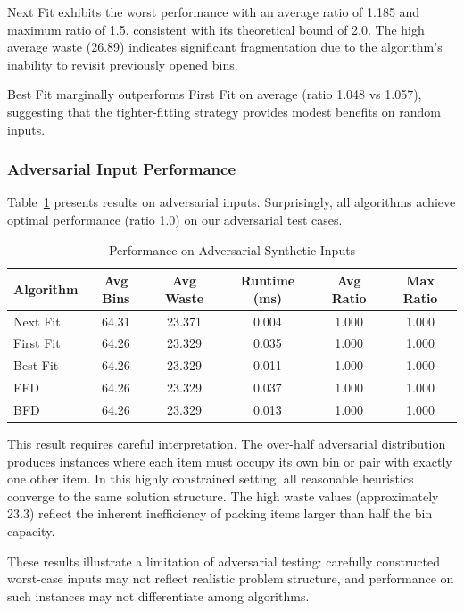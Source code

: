 \documentclass[11pt,a4paper]{article}
\begin{document}
Next Fit exhibits the worst performance with an average ratio of 1.185 and maximum ratio of 1.5, consistent with its theoretical bound of 2.0. The high average waste (26.89) indicates significant fragmentation due to the algorithm's inability to revisit previously opened bins.

Best Fit marginally outperforms First Fit on average (ratio 1.048 vs 1.057), suggesting that the tighter-fitting strategy provides modest benefits on random inputs.

\subsubsection{Adversarial Input Performance}

Table~\ref{tab:adversarial_results} presents results on adversarial inputs. Surprisingly, all algorithms achieve optimal performance (ratio 1.0) on our adversarial test cases.

\begin{table}[htbp]
\centering
\caption{Performance on Adversarial Synthetic Inputs}
\label{tab:adversarial_results}
\begin{tabular}{lccccc}
\toprule
\textbf{Algorithm} & \textbf{Avg Bins} & \textbf{Avg Waste} & \textbf{Runtime (ms)} & \textbf{Avg Ratio} & \textbf{Max Ratio} \\
\midrule
Next Fit & 64.31 & 23.371 & 0.004 & 1.000 & 1.000 \\
First Fit & 64.26 & 23.329 & 0.035 & 1.000 & 1.000 \\
Best Fit & 64.26 & 23.329 & 0.011 & 1.000 & 1.000 \\
FFD & 64.26 & 23.329 & 0.037 & 1.000 & 1.000 \\
BFD & 64.26 & 23.329 & 0.013 & 1.000 & 1.000 \\
\bottomrule
\end{tabular}
\end{table}

This result requires careful interpretation. The over-half adversarial distribution produces instances where each item must occupy its own bin or pair with exactly one other item. In this highly constrained setting, all reasonable heuristics converge to the same solution structure. The high waste values (approximately 23.3) reflect the inherent inefficiency of packing items larger than half the bin capacity.

These results illustrate a limitation of adversarial testing: carefully constructed worst-case inputs may not reflect realistic problem structure, and performance on such instances may not differentiate among algorithms.
\end{document}
